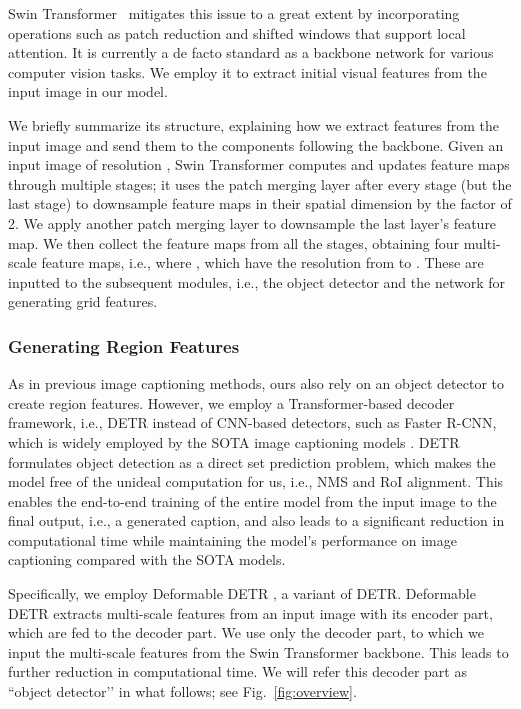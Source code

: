 \documentclass[runningheads]{llncs}
\begin{document}
Swin Transformer~\cite{liu2021swin} mitigates this issue to a great extent by incorporating operations such as patch reduction and shifted windows that support local attention. It is currently a de facto standard as a backbone network for various computer vision tasks. We employ it to extract initial visual features from the input image in our model. 

We briefly summarize its structure, explaining how we extract features from the input image and send them to the components following the backbone. Given an input image of resolution , Swin Transformer computes and updates feature maps through multiple stages; it uses the patch merging layer after every stage (but the last stage) to downsample feature maps in their spatial dimension by the factor of 2. We apply another patch merging layer to downsample the last layer's feature map. 
We then collect the feature maps from all the stages, obtaining four multi-scale feature maps, i.e.,  where , which have the resolution from  to . These are inputted to the subsequent modules, i.e.,  the object detector and the network for generating grid features.
\subsubsection{Generating Region Features}
As in previous image captioning methods, ours also rely on an object detector to create region features. However, we employ a Transformer-based decoder framework, i.e., DETR \cite{carion2020end} instead of CNN-based detectors, such as Faster R-CNN, which is widely employed by the SOTA image captioning models \cite{anderson2018bottom}. DETR formulates object detection as a direct set prediction problem, which makes the model free of the unideal computation for us, i.e., NMS and RoI alignment. This enables the end-to-end training of the entire model from the input image to the final output, i.e., a generated caption, and also leads to a significant reduction in computational time while maintaining the model’s performance on image captioning compared with the SOTA models. 

Specifically, we employ Deformable DETR \cite{zhu2021deformable}, a variant of DETR. Deformable DETR extracts multi-scale features from an input image with its encoder part, which are fed to the decoder part. We use only the decoder part, to which we input the multi-scale features from the Swin Transformer backbone. This leads to further reduction in computational time. 
We will refer this decoder part as ``object detector’’ in what follows; see Fig.~\ref{fig:overview}.
\end{document}
